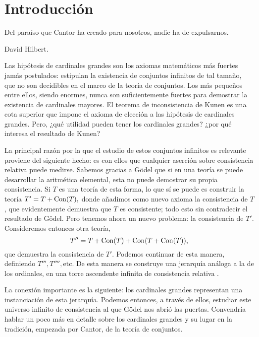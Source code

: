 \pagebreak
\chapter*{Introducción}

\epigraph
{
Del paraíso que Cantor ha creado para nosotros, nadie ha de expulsarnos.
}
{David Hilbert. \autocite[pág 170]{hilbert_uber_1926}}

Las hipótesis de cardinales grandes son los axiomas matemáticos
más fuertes jamás postulados: estipulan la existencia de conjuntos
infinitos de tal tamaño, que no son decidibles en el marco de la teoría de conjuntos.
Los más pequeños entre ellos, siendo enormes, nunca son suficientemente
fuertes para demostrar la existencia de cardinales mayores.
El teorema de inconsistencia de Kunen es
una cota superior que impone el axioma de elección a las
hipótesis de cardinales grandes.
Pero, ¿qué utilidad pueden tener los cardinales grandes?
¿por qué interesa el resultado de Kunen?

La principal razón por la que el estudio de estos conjuntos infinitos
es relevante proviene del siguiente hecho:
es con ellos que cualquier aserción sobre consistencia relativa
puede medirse.
Sabemos gracias a Gödel que si en una teoría se puede desarrollar la aritmética
elemental, esta no puede demostrar su propia consistencia.
Si $T$ es una teoría de esta forma, lo que sí se puede es construir la teoría
$T'=T+\operatorname{Con} ( T ),$
donde añadimos como nuevo axioma la consistencia
de $T$,
que evidentemente demuestra que $T$ es consistente; todo esto sin contradecir
el resultado de Gödel. Pero tenemos ahora un nuevo problema: la consistencia
de $T'$.
Consideremos entonces otra teoría,
\[T'' = T + \operatorname{Con} ( T ) + \operatorname{Con} ( T + \operatorname{Con} ( T ) ),\]
que demuestra la consistencia de $T'$.
Podemos continuar de esta manera, definiendo $T''', T'''',\text{etc}$.
De esta manera se construye una jerarquía análoga a la de los ordinales,
en una torre ascendente infinita de consistencia relativa
\autocite[\S 7.7]{hamkins_lectures_2020}.

La conexión importante es la siguiente:
los cardinales grandes representan una instanciación de esta jerarquía.
Podemos entonces, a través de ellos, estudiar este universo infinito de
consistencia al que Gödel nos abrió las puertas.
Convendría hablar un poco más en detalle sobre los cardinales grandes
y su lugar en la tradición, empezada por Cantor, de la teoría de conjuntos.

